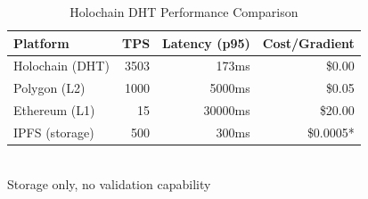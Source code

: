 
\begin{table}[t]
\centering
\caption{Holochain DHT Performance Comparison}
\label{tab:holochain_performance}
\begin{tabular}{lrrr}
\toprule
\textbf{Platform} & \textbf{TPS} & \textbf{Latency (p95)} & \textbf{Cost/Gradient} \\
\midrule
Holochain (DHT) & 3503 & 173ms & \$0.00 \\
Polygon (L2) & 1000 & 5000ms & \$0.05 \\
Ethereum (L1) & 15 & 30000ms & \$20.00 \\
IPFS (storage) & 500 & 300ms & \$0.0005* \\
\bottomrule
\end{tabular}
\\[0.5em]
\footnotesize *Storage only, no validation capability
\end{table}

